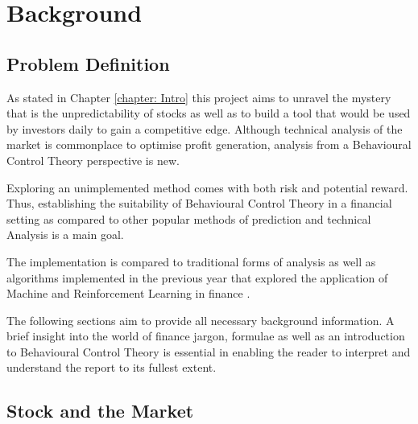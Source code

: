 \chapter{Background}
\label{Chapter: Background}



\section{Problem Definition}

As stated in Chapter \ref{chapter: Intro} this project aims to unravel the mystery that is the unpredictability of stocks as well as to build a tool that would be used by investors daily to gain a competitive edge. Although technical analysis of the market is commonplace to optimise profit generation, analysis  from a Behavioural Control Theory perspective is new. 

\noindent Exploring an unimplemented method comes with both risk and potential reward. Thus, establishing the suitability of Behavioural Control Theory in a financial setting as compared to other popular methods of prediction and technical Analysis is a main goal.  

\noindent The implementation is compared to traditional forms of analysis as well as algorithms implemented in the previous year that explored the application of Machine and Reinforcement Learning in finance \cite{ml_paper}. 

\noindent The following sections aim to provide all necessary background information. A brief insight into the world of finance jargon, formulae as well as an introduction to Behavioural Control Theory is essential in enabling the reader to interpret and understand the report to its fullest extent.


\section{Stock and the Market}
